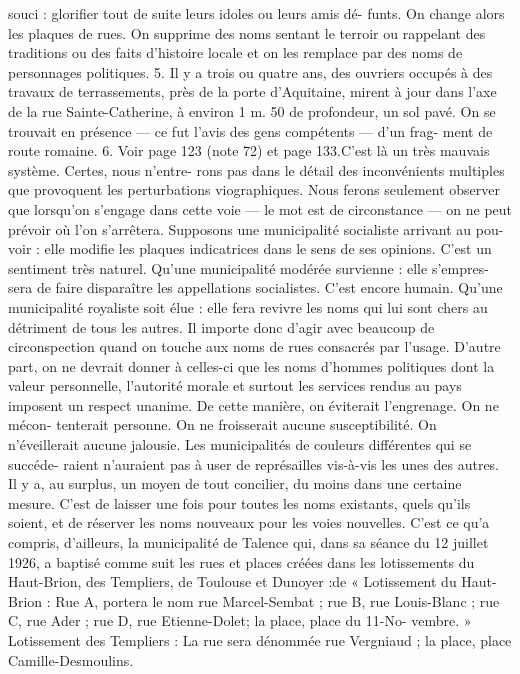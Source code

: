 \documentclass[a4paper,11pt]{book}
\begin{document}
souci : glorifier tout de suite leurs idoles ou leurs amis dé-
funts. On change alors les plaques de rues. On supprime
des noms sentant le terroir ou rappelant des traditions ou
des faits d'histoire locale et on les remplace par des noms
de personnages politiques.
5. Il y a trois ou quatre ans, des ouvriers occupés à des travaux de
terrassements, près de la porte d'Aquitaine, mirent à jour dans l'axe de la
rue Sainte-Catherine, à environ 1 m. 50 de profondeur, un sol pavé. On
se trouvait en présence — ce fut l'avis des gens compétents — d'un frag-
ment de route romaine.
6. Voir page 123 (note 72) et page 133.C'est là un très mauvais système. Certes, nous n'entre-
rons pas dans le détail des inconvénients multiples que
provoquent les perturbations viographiques. Nous ferons
seulement observer que lorsqu'on s'engage dans cette voie
— le mot est de circonstance — on ne peut prévoir où l'on
s'arrêtera.
Supposons une municipalité socialiste arrivant au pou-
voir : elle modifie les plaques indicatrices dans le sens de ses
opinions. C'est un sentiment très naturel.
Qu'une municipalité modérée survienne : elle s'empres-
sera de faire disparaître les appellations socialistes. C'est
encore humain.
Qu'une municipalité royaliste soit élue : elle fera revivre
les noms qui lui sont chers au détriment de tous les autres.
Il importe donc d'agir avec beaucoup de circonspection
quand on touche aux noms de rues consacrés par l'usage.
D'autre part, on ne devrait donner à celles-ci que les noms
d'hommes politiques dont la valeur personnelle, l'autorité
morale et surtout les services rendus au pays imposent un
respect unanime.
De cette manière, on éviterait l'engrenage. On ne mécon-
tenterait personne. On ne froisserait aucune susceptibilité.
On n'éveillerait aucune jalousie.
Les municipalités de couleurs différentes qui se succéde-
raient n'auraient pas à user de représailles vis-à-vis les
unes des autres.
Il y a, au surplus, un moyen de tout concilier, du moins
dans une certaine mesure. C'est de laisser une fois pour
toutes les noms existants, quels qu'ils soient, et de réserver
les noms nouveaux pour les voies nouvelles. C'est ce qu'a
compris, d'ailleurs, la municipalité de Talence qui, dans sa
séance du 12 juillet 1926, a baptisé comme suit les rues et
places créées dans les lotissements du Haut-Brion, des
Templiers, de Toulouse et Dunoyer :de
« Lotissement du Haut-Brion : Rue A, portera le nom
rue Marcel-Sembat ; rue B, rue Louis-Blanc ; rue C, rue
Ader ; rue D, rue Etienne-Dolet; la place, place du 11-No-
vembre.
» Lotissement des Templiers : La rue sera dénommée
rue Vergniaud ; la place, place Camille-Desmoulins.
\end{document}

